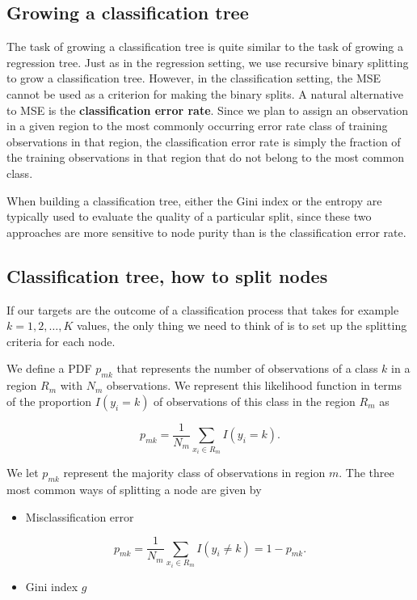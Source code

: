 \documentclass[%
oneside,                 %
final,                   %
10pt]{article}
\begin{document}
\subsection{Growing a classification tree}

The task of growing a
classification tree is quite similar to the task of growing a
regression tree. Just as in the regression setting, we use recursive
binary splitting to grow a classification tree. However, in the
classification setting, the MSE cannot be used as a criterion for making
the binary splits.  A natural alternative to MSE is the \textbf{classification
error rate}. Since we plan to assign an observation in a given region
to the most commonly occurring error rate class of training
observations in that region, the classification error rate is simply
the fraction of the training observations in that region that do not
belong to the most common class. 

When building a classification tree, either the Gini index or the
entropy are typically used to evaluate the quality of a particular
split, since these two approaches are more sensitive to node purity
than is the classification error rate. 


\subsection{Classification tree, how to split nodes}

If our targets are the outcome of a classification process that takes
for example $k=1,2,\dots,K$ values, the only thing we need to think of
is to set up the splitting criteria for each node.

We define a PDF $p_{mk}$ that represents the number of observations of
a class $k$ in a region $R_m$ with $N_m$ observations. We represent
this likelihood function in terms of the proportion $I(y_i=k)$ of
observations of this class in the region $R_m$ as

\[
p_{mk} = \frac{1}{N_m}\sum_{x_i\in R_m}I(y_i=k).
\]

We let $p_{mk}$ represent the majority class of observations in region
$m$. The three most common ways of splitting a node are given by

\begin{itemize}
\item Misclassification error 
\end{itemize}

\noindent
\[
p_{mk} = \frac{1}{N_m}\sum_{x_i\in R_m}I(y_i\ne k) = 1-p_{mk}.
\]
\begin{itemize}
\item Gini index $g$
\end{itemize}
\end{document}
